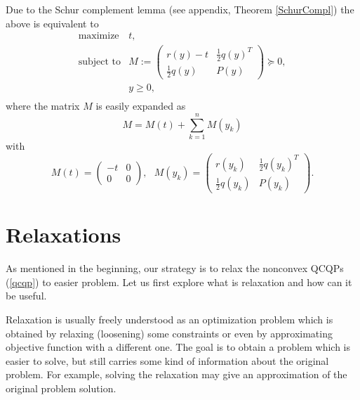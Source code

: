 \documentclass[10pt,oneside]{book}
\theoremstyle{definition}
\begin{document}
Due to the Schur complement lemma (see appendix, Theorem \ref{SchurCompl}) the above is equivalent to
\begin{equation}
\begin{array}{ll}
\mbox{maximize} & t, \\
\mbox{subject to}& M:=\left(\begin{array}{ll}
r(y)-t & \frac{1}{2}q(y)^T \\
\frac{1}{2}q(y) & P(y)
\end{array}\right)\succeq 0,
 \\
&y \geq 0,\\
\end{array} 
\end{equation}
where the matrix $M$ is easily expanded as 
\begin{equation}
M=M(t) + \sum_{k=1}^n M(y_k) 
\end{equation}
with
\begin{equation}
M(t) = \left(\begin{array}{rr} -t& 0\\ 0 & 0 \end{array}\right) , \ \ \ 
M(y_k) = \left(\begin{array}{ll} r(y_k)& \frac{1}{2}q(y_k)^T\\ \frac{1}{2}q(y_k) & P(y_k) \end{array}\right) . 
\end{equation}













\section{Relaxations}

As mentioned in the beginning, our strategy is to relax the nonconvex QCQPs (\ref{qcqp}) to easier problem. Let us first explore what is relaxation and how can it be useful. 

Relaxation is usually freely understood as an optimization problem which is obtained by relaxing (loosening) some constraints or even by approximating objective function with a different one. The goal is to obtain a problem which is easier to solve, but still carries some kind of information about the original problem. For example, solving the relaxation may give an approximation of the original problem solution.
\end{document}
